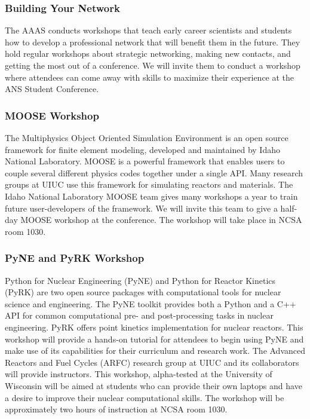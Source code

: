 \subsubsection{Building Your Network}
The AAAS conducts workshops that teach early career scientists and students how to develop a professional network that will benefit them in the future. They hold regular workshops about strategic networking, making new contacts, and getting the most out of a conference. We will invite them to conduct a workshop where attendees can come away with skills to maximize their experience at the ANS Student Conference.

\subsubsection{MOOSE Workshop}
The Multiphysics Object Oriented Simulation Environment is an open source framework for finite element modeling, developed and maintained by Idaho National Laboratory. MOOSE is a powerful framework that enables users to couple several different physics codes together under a single API. Many research groups at UIUC use this framework for simulating reactors and materials. The Idaho National Laboratory MOOSE team gives many workshops a year to train future user-developers of the framework. We will invite this team to give a half-day MOOSE workshop at the conference. The workshop will take place in NCSA room 1030.

\subsubsection{PyNE and PyRK Workshop}
Python for Nuclear Engineering (PyNE) and Python for Reactor Kinetics (PyRK) are two open source packages with computational tools for nuclear science and engineering. The PyNE toolkit provides both a Python and a C++ API for common computational pre- and post-processing tasks in nuclear engineering. PyRK offers point kinetics implementation for nuclear reactors. This workshop will provide a hands-on tutorial for attendees to begin using PyNE and make use of its capabilities for their curriculum and research work. The Advanced Reactors and Fuel Cycles (ARFC) research group at UIUC and its collaborators will provide instructors. This workshop, alpha-tested at the University of Wisconsin will be aimed at students who can provide their own laptops and have a desire to improve their nuclear computational skills. The workshop will be approximately two hours of instruction at NCSA room 1030.


